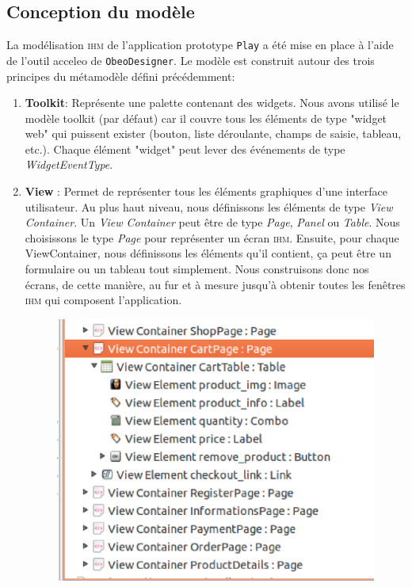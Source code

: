 \subsection{Conception du modèle}
La modélisation \textsc{ihm} de l'application prototype \texttt{Play} a été mise en place à l'aide de l'outil acceleo de \texttt{ObeoDesigner}. Le modèle est construit autour des trois principes du métamodèle défini précédemment:
\begin{enumerate}
\item \textbf{Toolkit}: Représente une palette contenant des widgets. Nous avons utilisé le modèle toolkit (par défaut) car il couvre tous les éléments de type "widget web" qui puissent exister (bouton, liste déroulante, champs de saisie, tableau, etc.). Chaque élément "widget" peut lever des événements de type \textit{WidgetEventType}.
\item \textbf{View} : Permet de représenter tous les éléments graphiques d'une interface utilisateur. Au plus haut niveau, nous définissons les éléments de type \textit{View Container}. 
\newline
Un \textit{View Container} peut être de type \textit{Page}, \textit{Panel} ou \textit{Table}. 
\newline
Nous choisissons le type \textit{Page} pour représenter un écran \textsc{ihm}. Ensuite, pour chaque ViewContainer, nous définissons les éléments qu'il contient, ça peut être un formulaire ou un tableau tout simplement. Nous construisons donc nos écrans, de cette manière, au fur et à mesure jusqu'à obtenir toutes les fenêtres \textsc{ihm} qui composent l'application.
\begin{figure}[H]
  \centering
  \includegraphics[scale=.4]{img/views.eps}

\end{figure}
\end{enumerate}
